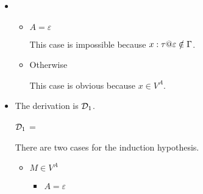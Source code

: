 \begin{itemize}
	\item \TVar
	      \begin{itemize}
	      	\item $ A = \varepsilon$
	      	      	      	      	      	      	      	      	      	      	      	      	      	      	      	      		      	      	      	      	      	      	      	      
	      	      This case is impossible because $x:\tau@\varepsilon \notin \G$.
	      	\item Otherwise
	      	      	      	      	      	      	      	      	      	      	      	      	      	      	      	      		      	      	      	      	      	      	      	      
	      	      This case is obvious because $x \in V^A$.
	      \end{itemize}
	      	      	      	      	      	      	      	      		      	      	      	      
	\item \TTBL
	      	      	      	      	      	      	      	      		      	      	      	      
	      The derivation is $\mathcal{D}_1$.
	      	      	      	      	      	      	      	      		      	      	      	      
	      $\mathcal{D}_1$ = 
	      {}
	      	      	      	      	      	      	      	      		      	      	      	      
	      There are two cases for the induction hypothesis.
	      	      	      	      	      	      	      	      		      	      	      	      
	      \begin{itemize}
	      		      		      		      		      		      		      		      			      		      		      		      	
	      	\item $ M \in V^A $
	      	      	      	      	      	      	      	      	      	      	      	      	      	      	      	      		      	      	      	      	      	      	      	      
	      	      \begin{itemize}
	      	      	\item $ A = \varepsilon $
	      	      	      	      	      	      	      	      	      	      	      	      	      	      	      	      	      	      	      	      	      	      	      	      		      	      	      	      	      	      	      	      	      	      	      	      

\end{itemize}
\end{itemize}
\end{itemize}
